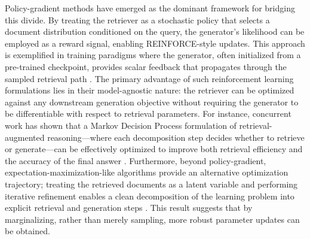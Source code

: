 \documentclass[11pt,a4paper]{article}
\begin{document}
Policy-gradient methods have emerged as the dominant framework for bridging this divide. By treating the retriever as a stochastic policy that selects a document distribution conditioned on the query, the generator's likelihood can be employed as a reward signal, enabling REINFORCE-style updates. This approach is exemplified in training paradigms where the generator, often initialized from a pre-trained checkpoint, provides scalar feedback that propagates through the sampled retrieval path \cite{arxiv:2005.11401v4}. The primary advantage of such reinforcement learning formulations lies in their model-agnostic nature: the retriever can be optimized against any downstream generation objective without requiring the generator to be differentiable with respect to retrieval parameters. For instance, concurrent work has shown that a Markov Decision Process formulation of retrieval-augmented reasoning---where each decomposition step decides whether to retrieve or generate---can be effectively optimized to improve both retrieval efficiency and the accuracy of the final answer \cite{arxiv:2502.01142v2}. Furthermore, beyond policy-gradient, expectation-maximization-like algorithms provide an alternative optimization trajectory; treating the retrieved documents as a latent variable and performing iterative refinement enables a clean decomposition of the learning problem into explicit retrieval and generation steps \cite{arxiv:2005.11401v4}. This result suggests that by marginalizing, rather than merely sampling, more robust parameter updates can be obtained.
\end{document}
